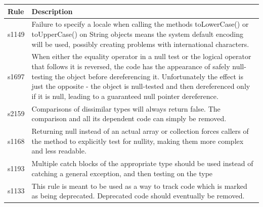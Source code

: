\documentclass{uvamscse}
\begin{document}
\begin{table}[]
	\centering
	
	\label{table:SQrules}
	\begin{tabular}{lp{10cm}}
		\textbf{Rule} & \textbf{Description}                       \\ \hline
		s1149         & Failure to specify a locale when calling the methods toLowerCase() or toUpperCase() on String objects means the system default encoding will be used, possibly creating problems with international characters.                                                                                                                                                    \\ \hline
		s1697         & When either the equality operator in a null test or the logical operator that follows it is reversed, the code has the appearance of safely null-testing the object before dereferencing it. Unfortunately the effect is just the opposite - the object is null-tested and then dereferenced only if it is null, leading to a guaranteed null pointer dereference. \\ \hline
		s2159         & Comparisons of dissimilar types will always return false. The comparison and all its dependent code can simply be removed.                                                                                                                                                                                                                                         \\ \hline
		s1168         & Returning null instead of an actual array or collection forces callers of the method to explicitly test for nullity, making them more complex and less readable.                                                                                                                                                                                                   \\ \hline
		s1193         & Multiple catch blocks of the appropriate type should be used instead of catching a general exception, and then testing on the type                                                                                                                                                                                                                                 \\ \hline
		s1133         & This rule is meant to be used as a way to track code which is marked as being deprecated. Deprecated code should eventually be removed.                                                                                                                                                                                                                            \\ \hline

\end{tabular}
\end{table}
\end{document}
